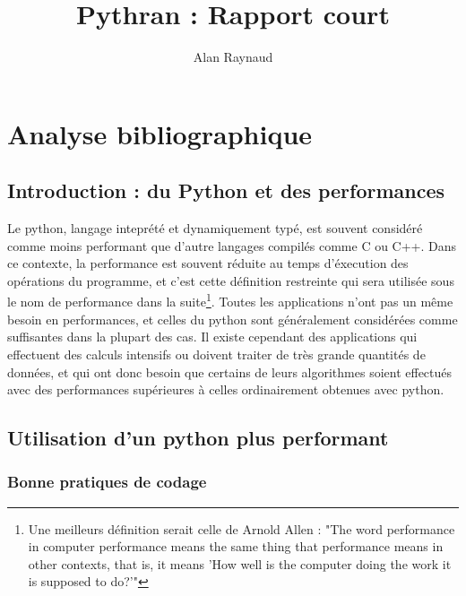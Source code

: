 \documentclass[a4paper]{article}
\title{Pythran : Rapport court}
\author{Alan Raynaud}
\date{}
\begin{document}

\maketitle   

\clearpage               

\tableofcontents            

\clearpage

\section{Analyse bibliographique}             

\subsection{Introduction : du Python et des performances}

Le python, langage inteprété et dynamiquement typé, est souvent considéré comme moins performant que d'autre langages compilés comme C ou C++. Dans ce contexte, la performance est souvent réduite au temps d'éxecution des opérations du programme, et c'est cette définition restreinte qui sera utilisée sous le nom de performance dans la suite\footnote{Une meilleurs définition serait celle de Arnold Allen : "The word performance in computer performance means the same thing that performance means in other contexts, that is, it means 'How well is the computer doing the work it is supposed to do?'"\cite{Allen}}. Toutes les applications n'ont pas un même besoin en performances, et celles du python sont généralement considérées comme suffisantes dans la plupart des cas. Il existe cependant des applications qui effectuent des calculs intensifs ou doivent traiter de très grande quantités de données, et qui ont donc besoin que certains de leurs algorithmes soient effectués avec des performances supérieures à celles ordinairement obtenues avec python.

\subsection{Utilisation d'un python plus performant}

\label{OptCode}

\subsubsection{Bonne pratiques de codage}
\end{document}
